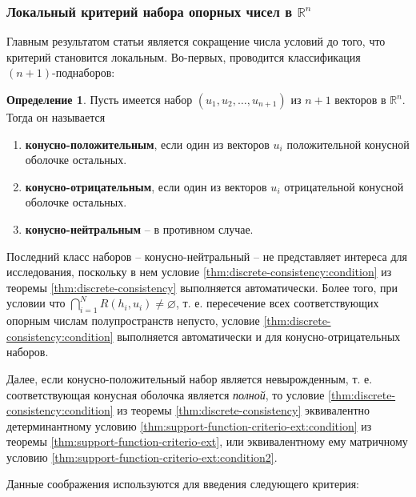 \documentclass[a4paper, 12pt, titlepage]{article}
\theoremstyle{definition}
\newtheorem{SmartDefinition}{Определение}
\theoremstyle{plain}
\theoremstyle{plain}
\begin{document}
\subsubsection{Локальный критерий набора опорных чисел в $\mathbb{R}^{n}$}
\label{sec:history/KarlKVW96/support-vector-criterion-local}

Главным результатом статьи является сокращение числа условий до того, что 
критерий становится локальным. Во-первых, проводится классификация $(n + 
1)$-поднаборов:

\begin{SmartDefinition}
 \label{def:tuples-classifiction}
 Пусть имеется набор $(u_{1}, u_{2}, \ldots, u_{n + 1})$ из $n + 1$ векторов в
 $\mathbb{R}^{n}$. Тогда он называется
 \begin{enumerate}
  \item \textbf{конусно-положительным}, если один из векторов $u_{i}$
  положительной конусной оболочке остальных.
  \item \textbf{конусно-отрицательным}, если один из векторов $u_{i}$
  отрицательной конусной оболочке остальных.
  \item \textbf{конусно-нейтральным} -- в противном случае.
 \end{enumerate}
\end{SmartDefinition}

Последний класс наборов -- конусно-нейтральный -- не представляет интереса для
исследования, поскольку в нем условие \ref{thm:discrete-consistency:condition}
из теоремы \ref{thm:discrete-consistency} выполняется автоматически. Более
того, при условии что
$\bigcap \limits_{i = 1}^{N} R(h_{i}, u_{i}) \neq \varnothing$,
т. е. пересечение всех соответствующих опорным числам полупространств непусто,
условие \ref{thm:discrete-consistency:condition} выполняется автоматически и 
для конусно-отрицательных наборов.

Далее, если конусно-положительный набор является невырожденным, т. е.
соответствующая конусная оболочка является \textit{полной}, то условие
\ref{thm:discrete-consistency:condition} из теоремы
\ref{thm:discrete-consistency} эквивалентно детерминантному условию
\ref{thm:support-function-criterio-ext:condition} из теоремы
\ref{thm:support-function-criterio-ext}, или эквивалентному ему матричному
условию \ref{thm:support-function-criterio-ext:condition2}.

Данные соображения используются для введения следующего критерия:
\end{document}

